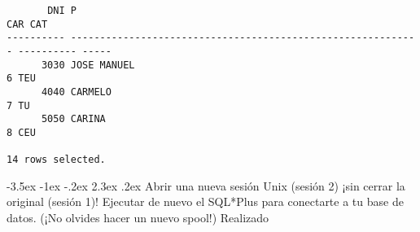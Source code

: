 \documentclass[11pt]{report}
\makeatletter
\renewcommand\chapter{\@startsection{chapter}{0}{\z@}%
    {-3.5ex \@plus -1ex \@minus -.2ex}%
    {2.3ex \@plus.2ex}%
    {\normalfont\Large\bfseries}}
\makeatother
\begin{document}
\begin{itemize}
\begin{verbatim}
       DNI P                                                                  CAR CAT                                                                                                                  
---------- ------------------------------------------------------------ ---------- -----                                                                                                                
      3030 JOSE MANUEL                                                           6 TEU                                                                                                                  
      4040 CARMELO                                                               7 TU                                                                                                                   
      5050 CARINA                                                                8 CEU                                                                                                                  

14 rows selected.
  \end{verbatim}
\end{itemize}

\chapter{Abrir una nueva sesión Unix (sesión 2) ¡sin cerrar la original (sesión 1)! Ejecutar de nuevo el SQL*Plus para conectarte a tu base de datos. (¡No olvides hacer un nuevo spool!)}
Realizado

\end{document}
